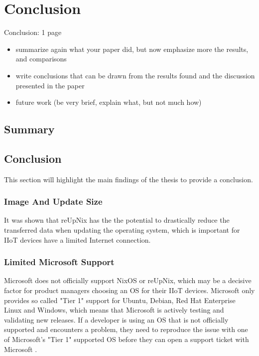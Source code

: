 \chapter{Conclusion}

Conclusion: 1 page

\begin{itemize}
\item summarize again what your paper did, but now emphasize more the results, and comparisons
\item write conclusions that can be drawn from the results found and the discussion presented in the paper
\item future work (be very brief, explain what, but not much how)
\end{itemize}

\section{Summary}

\section{Conclusion}
This section will highlight the main findings of the thesis to provide a
conclusion.

\subsection{Image And Update Size}
It was shown that reUpNix has the the potential to drastically reduce the transferred
data when updating the operating system, which is important for \ac{IIoT} devices
have a limited Internet connection.

\subsection{Limited Microsoft Support}
Microsoft does not officially support NixOS or reUpNix, which may be a decisive factor
for product managers choosing an \ac{OS} for their \ac{IIoT} devices. Microsoft
only provides so called "Tier 1" support for Ubuntu, Debian, Red Hat Enterprise
Linux and Windows, which means that Microsoft is actively testing and validating
new releases. If a developer is using an \ac{OS} that is not officially supported
and encounters a problem, they need to reproduce the issue with one of Microsoft's
"Tier 1" supported \ac{OS} before they can open a support ticket with Microsoft
\cite{msdoc-supportetplatforms}.


